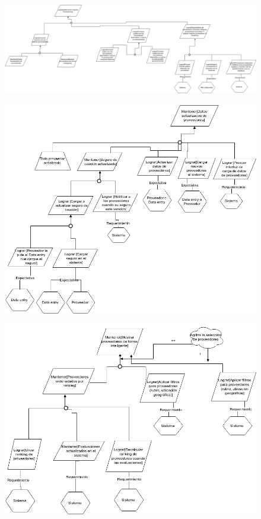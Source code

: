\begin{figure}[H]
    \centering
    \includegraphics[width=9in, keepaspectratio, angle=90]{imagenes/objetivos-seleccion-mejor-proveedor-principal.png}
\end{figure}

\begin{figure}[H]
    \centering
    \includegraphics[width=\textwidth]{imagenes/objetivos-seleccion-mejor-proveedor-1.png}
\end{figure}

\begin{figure}[H]
    \centering
    \includegraphics[width=\textwidth]{imagenes/objetivos-seleccion-mejor-proveedor-2.png}
\end{figure}

